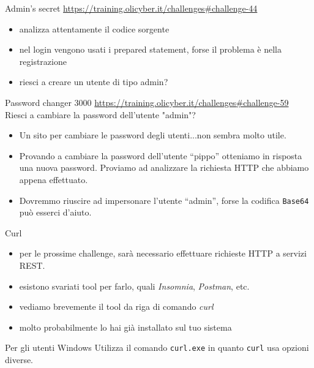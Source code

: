 \documentclass[12pt]{beamer}
\begin{document}
\begin{frame}{Admin's secret}
\url{https://training.olicyber.it/challenges\#challenge-44}
\vfill
\begin{itemize}
    \item analizza attentamente il codice sorgente
    \pause
    \item nel login vengono usati i prepared statement, forse il problema è nella registrazione
    \pause
    \item riesci a creare un utente di tipo admin?
\end{itemize}

\end{frame}

\begin{frame}{Password changer 3000}
    \url{https://training.olicyber.it/challenges\#challenge-59}
    \vfill
    Riesci a cambiare la password dell'utente "admin"?
    \begin{itemize}
        \item Un sito per cambiare le password degli utenti...non sembra molto utile.
        \pause
        \item Provando a cambiare la password dell'utente ``pippo'' otteniamo in risposta una nuova password. Proviamo ad analizzare la richiesta HTTP che abbiamo appena effettuato. 
        \pause
        \item Dovremmo riuscire ad impersonare l'utente ``admin'', forse la codifica \texttt{Base64} può esserci d'aiuto.
        \pause
    \end{itemize}
\end{frame}

\begin{frame}{Curl}
\begin{itemize}
    \item per le prossime challenge, sarà necessario effettuare richieste HTTP a servizi REST. 
    \item esistono svariati tool per farlo, quali \textit{Insomnia}, \textit{Postman}, etc.
    \item vediamo brevemente il tool da riga di comando \textit{curl}
    \item molto probabilmente lo hai già installato sul tuo sistema
\end{itemize}
\vfill
\begin{alertblock}{Per gli utenti Windows}
Utilizza il comando \texttt{curl.exe} in quanto \texttt{curl} usa opzioni diverse.
\end{alertblock}
\end{frame}
\end{document}
